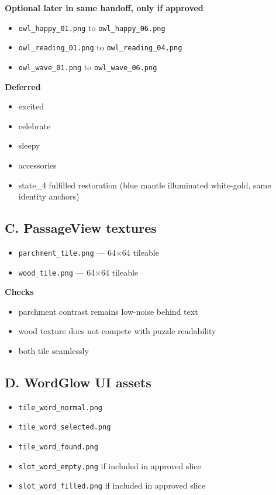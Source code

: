 \documentclass[11pt,a4paper]{article}
\newcommand{\checkbox}{\ensuremath{\square}}
\begin{document}
\textbf{Optional later in same handoff, only if approved}
\begin{itemize}
  \item[\checkbox] \texttt{owl\_happy\_01.png} to \texttt{owl\_happy\_06.png}
  \item[\checkbox] \texttt{owl\_reading\_01.png} to \texttt{owl\_reading\_04.png}
  \item[\checkbox] \texttt{owl\_wave\_01.png} to \texttt{owl\_wave\_06.png}
\end{itemize}

\textbf{Deferred}
\begin{itemize}
  \item[\checkbox] excited
  \item[\checkbox] celebrate
  \item[\checkbox] sleepy
  \item[\checkbox] accessories
  \item[\checkbox] state\_4 fulfilled restoration (blue mantle illuminated white-gold, same identity anchors)
\end{itemize}

\subsection*{C. PassageView textures}
\begin{itemize}
  \item[\checkbox] \texttt{parchment\_tile.png} — 64×64 tileable
  \item[\checkbox] \texttt{wood\_tile.png} — 64×64 tileable
\end{itemize}

\textbf{Checks}
\begin{itemize}
  \item[\checkbox] parchment contrast remains low-noise behind text
  \item[\checkbox] wood texture does not compete with puzzle readability
  \item[\checkbox] both tile seamlessly
\end{itemize}

\subsection*{D. WordGlow UI assets}
\begin{itemize}
  \item[\checkbox] \texttt{tile\_word\_normal.png}
  \item[\checkbox] \texttt{tile\_word\_selected.png}
  \item[\checkbox] \texttt{tile\_word\_found.png}
  \item[\checkbox] \texttt{slot\_word\_empty.png} if included in approved slice
  \item[\checkbox] \texttt{slot\_word\_filled.png} if included in approved slice
\end{itemize}
\end{document}
